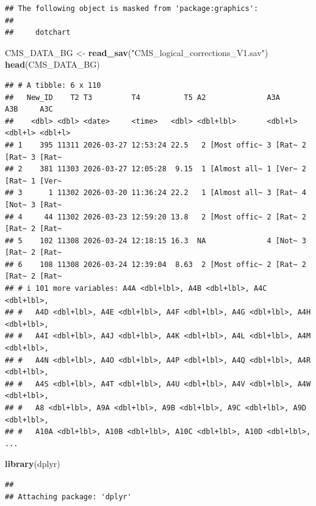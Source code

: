 \documentclass[
]{article}
\newenvironment{Shaded}{\begin{snugshade}}{\end{snugshade}}
\newcommand{\FunctionTok}[1]{\textcolor[rgb]{0.13,0.29,0.53}{\textbf{#1}}}
\newcommand{\NormalTok}[1]{#1}
\newcommand{\OtherTok}[1]{\textcolor[rgb]{0.56,0.35,0.01}{#1}}
\newcommand{\StringTok}[1]{\textcolor[rgb]{0.31,0.60,0.02}{#1}}
\begin{document}
\begin{verbatim}
## The following object is masked from 'package:graphics':
## 
##     dotchart
\end{verbatim}

\begin{Shaded}
\begin{Highlighting}[]
\NormalTok{CMS\_DATA\_BG }\OtherTok{\textless{}{-}} \FunctionTok{read\_sav}\NormalTok{(}\StringTok{"CMS\_logical\_corrections\_V1.sav"}\NormalTok{)}
\FunctionTok{head}\NormalTok{(CMS\_DATA\_BG)}
\end{Highlighting}
\end{Shaded}

\begin{verbatim}
## # A tibble: 6 x 110
##   New_ID    T2 T3         T4          T5 A2              A3A     A3B     A3C    
##    <dbl> <dbl> <date>     <time>   <dbl> <dbl+lbl>       <dbl+l> <dbl+l> <dbl+l>
## 1    395 11311 2026-03-27 12:53:24 22.5   2 [Most offic~ 3 [Rat~ 2 [Rat~ 3 [Rat~
## 2    381 11303 2026-03-27 12:05:28  9.15  1 [Almost all~ 1 [Ver~ 2 [Rat~ 1 [Ver~
## 3      1 11302 2026-03-20 11:36:24 22.2   1 [Almost all~ 3 [Rat~ 4 [Not~ 3 [Rat~
## 4     44 11302 2026-03-23 12:59:20 13.8   2 [Most offic~ 2 [Rat~ 2 [Rat~ 2 [Rat~
## 5    102 11308 2026-03-24 12:18:15 16.3  NA              4 [Not~ 3 [Rat~ 2 [Rat~
## 6    108 11308 2026-03-24 12:39:04  8.63  2 [Most offic~ 2 [Rat~ 2 [Rat~ 2 [Rat~
## # i 101 more variables: A4A <dbl+lbl>, A4B <dbl+lbl>, A4C <dbl+lbl>,
## #   A4D <dbl+lbl>, A4E <dbl+lbl>, A4F <dbl+lbl>, A4G <dbl+lbl>, A4H <dbl+lbl>,
## #   A4I <dbl+lbl>, A4J <dbl+lbl>, A4K <dbl+lbl>, A4L <dbl+lbl>, A4M <dbl+lbl>,
## #   A4N <dbl+lbl>, A4O <dbl+lbl>, A4P <dbl+lbl>, A4Q <dbl+lbl>, A4R <dbl+lbl>,
## #   A4S <dbl+lbl>, A4T <dbl+lbl>, A4U <dbl+lbl>, A4V <dbl+lbl>, A4W <dbl+lbl>,
## #   A8 <dbl+lbl>, A9A <dbl+lbl>, A9B <dbl+lbl>, A9C <dbl+lbl>, A9D <dbl+lbl>,
## #   A10A <dbl+lbl>, A10B <dbl+lbl>, A10C <dbl+lbl>, A10D <dbl+lbl>, ...
\end{verbatim}

\begin{Shaded}
\begin{Highlighting}[]
\FunctionTok{library}\NormalTok{(dplyr)}
\end{Highlighting}
\end{Shaded}

\begin{verbatim}
## 
## Attaching package: 'dplyr'
\end{verbatim}
\end{document}
